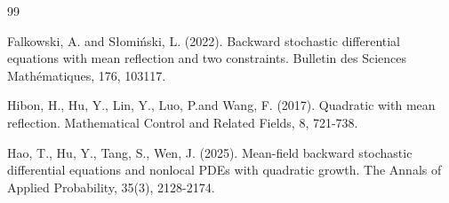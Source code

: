 \documentclass[10pt]{article}%
\numberwithin{equation}{section}
\begin{document}
\begin{thebibliography}{99}




 Falkowski, A. and Słomiński, L. (2022). Backward stochastic differential equations with mean reflection and two constraints. Bulletin des Sciences Mathématiques, 176, 103117.






 Hibon, H., Hu, Y., Lin, Y., Luo, P.and Wang, F. (2017). Quadratic  with mean reflection. Mathematical Control and Related Fields, 8, 721-738.

 Hao, T., Hu, Y., Tang, S., Wen, J. (2025). Mean-field backward stochastic differential equations and nonlocal PDEs with quadratic growth. The Annals of Applied Probability, 35(3), 2128-2174.


\end{thebibliography}
\end{document}
